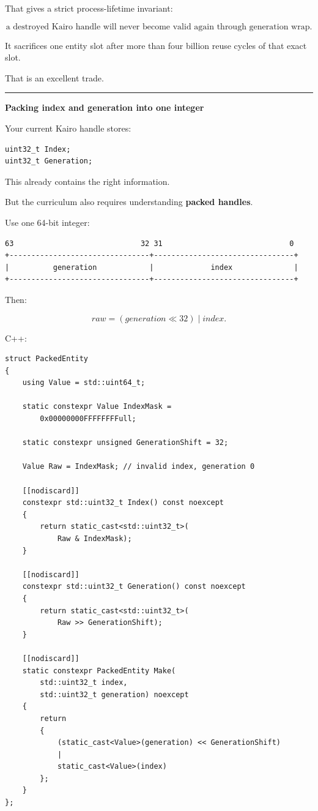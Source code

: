 That gives a strict process-lifetime invariant:

\[
\boxed{
\text{a destroyed Kairo handle will never become valid again through generation wrap}.
}
\]

It sacrifices one entity slot after more than four billion reuse cycles of that exact slot.

That is an excellent trade.

\begin{center}\rule{0.5\linewidth}{0.5pt}\end{center}

\textbf{Packing index and generation into one integer}

Your current Kairo handle stores:

\begin{verbatim}
uint32_t Index;
uint32_t Generation;
\end{verbatim}

This already contains the right information.

But the curriculum also requires understanding \textbf{packed handles}.

Use one 64-bit integer:

\begin{verbatim}
63                             32 31                             0
+--------------------------------+--------------------------------+
|          generation            |             index              |
+--------------------------------+--------------------------------+
\end{verbatim}

Then:

\[
raw=
(generation\ll32)
\;|\;
index.
\]

C++:

\begin{verbatim}
struct PackedEntity
{
    using Value = std::uint64_t;

    static constexpr Value IndexMask =
        0x00000000FFFFFFFFull;

    static constexpr unsigned GenerationShift = 32;

    Value Raw = IndexMask; // invalid index, generation 0

    [[nodiscard]]
    constexpr std::uint32_t Index() const noexcept
    {
        return static_cast<std::uint32_t>(
            Raw & IndexMask);
    }

    [[nodiscard]]
    constexpr std::uint32_t Generation() const noexcept
    {
        return static_cast<std::uint32_t>(
            Raw >> GenerationShift);
    }

    [[nodiscard]]
    static constexpr PackedEntity Make(
        std::uint32_t index,
        std::uint32_t generation) noexcept
    {
        return
        {
            (static_cast<Value>(generation) << GenerationShift)
            |
            static_cast<Value>(index)
        };
    }
};
\end{verbatim}

